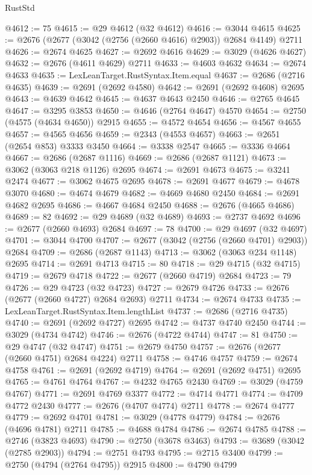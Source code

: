 \begin{lexlean}{RustStd}
\begin{coremodule}
@4612 := 75
@4615 := @29 @4612 (@32 @4612)
@4616 := @3044 @4615
@4625 := @2676 (@2677 (@3042 (@2756 (@2660 @4616) @2903)) @2684 @4149) @2711
@4626 := @2674 @4625
@4627 := @2692 @4616
@4629 := @3029 (@4626 @4627)
@4632 := @2676 (@4611 @4629) @2711
@4633 := @4603 @4632
@4634 := @2674 @4633
@4635 := LexLeanTarget.RustSyntax.Item.equal
@4637 := @2686 (@2716 @4635)
@4639 := @2691 (@2692 @4580)
@4642 := @2691 (@2692 @4608) @2695
@4643 := @4639 @4642
@4645 := @4637 @4643 @2450
@4646 := @2765 @4645
@4647 := @3295 @3853
@4650 := @4646 (@2764 @4647) @4570
@4654 := @2750 (@4575 (@4634 @4650)) @2915
@4655 := @4572 @4654
@4656 := @4567 @4655
@4657 := @4565 @4656
@4659 := @2343 (@4553 @4657)
@4663 := @2651 (@2654 @853) @3333 @3450
@4664 := @3338 @2547
@4665 := @3336 @4664
@4667 := @2686 (@2687 @1116)
@4669 := @2686 (@2687 @1121)
@4673 := @3062 (@3063 @218 @1126) @2695
@4674 := @2691 @4673
@4675 := @3241 @2474
@4677 := @3062 @4675 @2695
@4678 := @2691 @4677
@4679 := @4678 @3070
@4680 := @4674 @4679
@4682 := @4669 @4680 @2450
@4684 := @2691 @4682 @2695
@4686 := @4667 @4684 @2450
@4688 := @2676 (@4665 @4686)
@4689 := 82
@4692 := @29 @4689 (@32 @4689)
@4693 := @2737 @4692
@4696 := @2677 (@2660 @4693) @2684
@4697 := 78
@4700 := @29 @4697 (@32 @4697)
@4701 := @3044 @4700
@4707 := @2677 (@3042 (@2756 (@2660 @4701) @2903)) @2684
@4709 := @2686 (@2687 @1143)
@4713 := @3062 (@3063 @234 @1148) @2695
@4714 := @2691 @4713
@4715 := 80
@4718 := @29 @4715 (@32 @4715)
@4719 := @2679 @4718
@4722 := @2677 (@2660 @4719) @2684
@4723 := 79
@4726 := @29 @4723 (@32 @4723)
@4727 := @2679 @4726
@4733 := @2676 (@2677 (@2660 @4727) @2684 @2693) @2711
@4734 := @2674 @4733
@4735 := LexLeanTarget.RustSyntax.Item.lengthList
@4737 := @2686 (@2716 @4735)
@4740 := @2691 (@2692 @4727) @2695
@4742 := @4737 @4740 @2450
@4744 := @3029 (@4734 @4742)
@4746 := @2676 (@4722 @4744)
@4747 := 81
@4750 := @29 @4747 (@32 @4747)
@4751 := @2679 @4750
@4757 := @2676 (@2677 (@2660 @4751) @2684 @4224) @2711
@4758 := @4746 @4757
@4759 := @2674 @4758
@4761 := @2691 (@2692 @4719)
@4764 := @2691 (@2692 @4751) @2695
@4765 := @4761 @4764
@4767 := @4232 @4765 @2430
@4769 := @3029 (@4759 @4767)
@4771 := @2691 @4769 @3377
@4772 := @4714 @4771
@4774 := @4709 @4772 @2430
@4777 := @2676 (@4707 @4774) @2711
@4778 := @2674 @4777
@4779 := @2692 @4701
@4781 := @3029 (@4778 @4779)
@4784 := @2676 (@4696 @4781) @2711
@4785 := @4688 @4784
@4786 := @2674 @4785
@4788 := @2746 (@3823 @4693)
@4790 := @2750 (@3678 @3463)
@4793 := @3689 (@3042 (@2785 @2903))
@4794 := @2751 @4793
@4795 := @2715 @3400
@4799 := @2750 (@4794 (@2764 @4795)) @2915
@4800 := @4790 @4799

\end{coremodule}
\end{lexlean}
